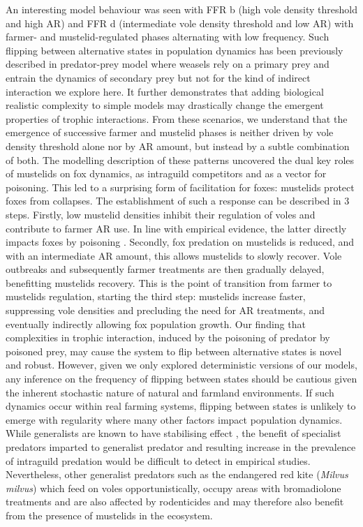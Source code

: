 \documentclass[11pt]{article}
\begin{document}
An interesting model behaviour was seen with FFR b (high vole density threshold and high AR) and FFR d (intermediate vole density threshold and low AR) with farmer- and mustelid-regulated phases alternating with low frequency. Such flipping between alternative states in population dynamics has been previously described in predator-prey model where weasels rely on a primary prey and entrain the dynamics of secondary prey \citep{Hanski1996} but not for the kind of indirect interaction we explore here. It further demonstrates that adding biological realistic complexity to simple models may drastically change the emergent properties of trophic interactions.
From these scenarios, we understand that the emergence of successive farmer and mustelid phases is neither driven by vole density threshold alone nor by AR amount, but instead by a subtle combination of both. The modelling description of these patterns uncovered the dual key roles of mustelids on fox dynamics, as intraguild competitors and as a vector for poisoning. This led to a surprising form of facilitation for foxes: mustelids protect foxes from collapses. The establishment of such a response can be described in 3 steps. Firstly, low mustelid densities inhibit their regulation of voles and contribute to farmer AR use. In line with empirical evidence, the latter directly impacts foxes by poisoning \citep{Jacquot2013}. Secondly, fox predation on mustelids is reduced, and with an intermediate AR amount, this allows mustelids to slowly recover. Vole outbreaks and subsequently farmer treatments are then gradually delayed, benefitting mustelids recovery. This is the point of transition from farmer to mustelids regulation, starting the third step: mustelids increase faster, suppressing vole densities and precluding the need for AR treatments, and eventually indirectly allowing fox population growth. Our finding that complexities in trophic interaction, induced by the poisoning of predator by poisoned prey, may cause the system to flip between alternative states is novel and robust. However, given we only explored deterministic versions of our models, any inference on the frequency of flipping between states should be cautious given the inherent stochastic nature of natural and farmland environments. If such dynamics occur within real farming systems, flipping between states is unlikely to emerge with regularity where many other factors impact population dynamics. While generalists are known to have stabilising effect \citep{Hanski1991}, the benefit of specialist predators imparted to generalist predator and resulting increase in the prevalence of intraguild predation would be difficult to detect in empirical studies. Nevertheless, other generalist predators such as the endangered red kite (\textit{Milvus milvus}) which feed on voles opportunistically, occupy areas with bromadiolone treatments and are also affected by rodenticides \citep{Coeurdassier2014} and may therefore also benefit from the presence of mustelids in the ecosystem.
\end{document}
